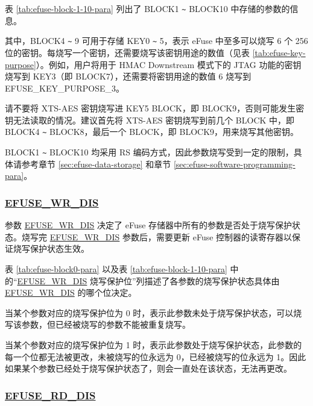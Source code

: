 \documentclass[main\_\_CN.tex]{subfiles}
\begin{document}



表 \ref{tab:efuse-block-1-10-para} 列出了 BLOCK1 \verb+~+ BLOCK10 中存储的参数的信息。



其中，BLOCK4 \verb+~+ 9 可用于存储 KEY0 \verb+~+ 5，表示 eFuse 中至多可以烧写 6 个 256 位的密钥。每烧写一个密钥，还需要烧写该密钥用途的数值（见表 \ref{tab:efuse-key-purpose}）。例如，用户将用于 HMAC Downstream 模式下的 JTAG 功能的密钥烧写到 KEY\textcolor{myred}{3}（即 BLOCK7），还需要将密钥用途的数值 6 烧写到 EFUSE\_KEY\_PURPOSE\_\textcolor{myred}{3}。

\begin{tiplisting}
请不要将 XTS-AES 密钥烧写进 KEY5 BLOCK，即 BLOCK9，否则可能发生密钥无法读取的情况。建议首先将 XTS-AES 密钥烧写到前几个 BLOCK 中，即 BLOCK4 \verb+~+ BLOCK8，最后一个 BLOCK，即 BLOCK9，用来烧写其他密钥。
\end{tiplisting}

BLOCK1 \verb+~+ BLOCK10 均采用 RS 编码方式，因此参数烧写受到一定的限制，具体请参考章节 \ref{sec:efuse-data-storage} 和章节 \ref{sec:efuse-software-programming-para}。

\subsubsection{\hyperref[fielddesc:EFUSEWRDIS]{EFUSE\_WR\_DIS}}
\label{sec:efuse-wr-dis}

参数 \hyperref[fielddesc:EFUSEWRDIS]{EFUSE\_WR\_DIS} 决定了 eFuse 存储器中所有的参数是否处于烧写保护状态。烧写完 \hyperref[fielddesc:EFUSEWRDIS]{EFUSE\_WR\_DIS} 参数后，需要更新 eFuse 控制器的读寄存器以保证烧写保护状态生效。

表 \ref{tab:efuse-block0-para} 以及表 \ref{tab:efuse-block-1-10-para} 中的“\hyperref[fielddesc:EFUSEWRDIS]{EFUSE\_WR\_DIS} 烧写保护位”列描述了各参数的烧写保护状态具体由 \hyperref[fielddesc:EFUSEWRDIS]{EFUSE\_WR\_DIS} 的哪个位决定。

当某个参数对应的烧写保护位为 0 时，表示此参数未处于烧写保护状态，可以烧写该参数，但已经被烧写的参数不能被重复烧写。

当某个参数对应的烧写保护位为 1 时，表示此参数处于烧写保护状态，此参数的每一个位都无法被更改，未被烧写的位永远为 0，已经被烧写的位永远为 1。因此如果某个参数已经处于烧写保护状态了，则会一直处在该状态，无法再更改。

\subsubsection{\hyperref[fielddesc:EFUSERDDIS]{EFUSE\_RD\_DIS}}
\label{sec:efuse-rd-dis}
\end{document}

